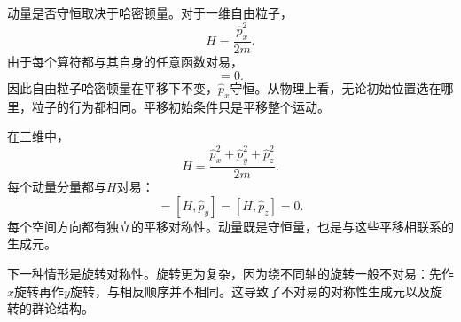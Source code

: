 \begin{classroomqa}
\end{classroomqa}

动量是否守恒取决于哈密顿量。对于一维自由粒子，
\begin{equation}
H=\frac{\hat p_x^2}{2m}.
\end{equation}
由于每个算符都与其自身的任意函数对易，
\begin{equation}
[H,\hat p_x]=0.
\end{equation}
因此自由粒子哈密顿量在平移下不变，\(\hat p_x\)守恒。从物理上看，无论初始位置选在哪里，粒子的行为都相同。平移初始条件只是平移整个运动。

在三维中，
\begin{equation}
H
=
\frac{\hat p_x^2+\hat p_y^2+\hat p_z^2}{2m}.
\end{equation}
每个动量分量都与\(H\)对易：
\begin{equation}
[H,\hat p_x]=[H,\hat p_y]=[H,\hat p_z]=0.
\end{equation}
每个空间方向都有独立的平移对称性。动量既是守恒量，也是与这些平移相联系的生成元。

下一种情形是旋转对称性。旋转更为复杂，因为绕不同轴的旋转一般不对易：先作\(x\)旋转再作\(y\)旋转，与相反顺序并不相同。这导致了不对易的对称性生成元以及旋转的群论结构。
